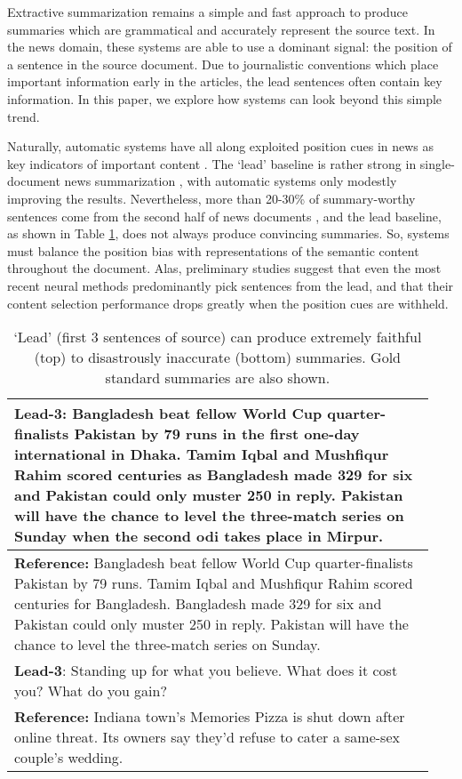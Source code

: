 Extractive summarization remains a simple 
and fast approach to produce summaries which 
are grammatical and accurately represent the source text.
In the news domain, these systems are able to 
use a dominant signal: the position of a sentence 
in the source document. 
Due to journalistic conventions which place important information
early in the articles, the lead sentences often contain key information. In this paper, we explore how systems can look beyond this simple trend. 

Naturally, automatic systems have 
all along exploited position cues in news 
as key indicators of important content \parencite{schiffman,hong2014improving,ext_bert}. 
The `lead' baseline is rather strong in single-document news summarization \parencite{brandow1995automatic,nenkova2005automatic}, 
with automatic systems only modestly improving the results. 
Nevertheless, more than 20-30\% of 
summary-worthy sentences come from the second half of news documents \parencite{data2_nallapati2016abstractive,kedzie2018content}, 
and the lead baseline, as shown in Table \ref{tab:lead_ex},
does not always produce convincing summaries.
So, systems must balance the position bias with representations of the semantic content 
throughout the document. Alas, preliminary studies
\parencite{kedzie2018content} suggest that even the most recent neural 
methods predominantly pick sentences from the lead, and 
that their content selection performance drops greatly
when the position cues are withheld.

\begin{table}[t]
    \centering
    \small
    \begin{tabular}{|p{0.94\linewidth}|}
        \hline
        \textbf{Lead-3:} Bangladesh beat fellow World Cup quarter-finalists Pakistan by 79 runs in the first one-day international in Dhaka. Tamim Iqbal and Mushfiqur Rahim scored centuries as Bangladesh made 329 for six and Pakistan could only muster 250 in reply. Pakistan will have the chance to level the three-match series on Sunday when the second odi takes place in Mirpur. \\ \hline
        \textbf{Reference:} Bangladesh beat fellow World Cup quarter-finalists Pakistan by 79 runs. Tamim Iqbal and Mushfiqur Rahim scored centuries for Bangladesh. Bangladesh made 329 for six and Pakistan could only muster 250 in reply. Pakistan will have the chance to level the three-match series on Sunday. \\ \hline \hline
        \textbf{Lead-3}: Standing up for what you believe. What does it cost you? What do you gain? \\ \hline
        \textbf{Reference:} Indiana town's Memories Pizza is shut down after online threat. Its owners say they'd refuse to cater a same-sex couple's wedding. \\
        \hline
    \end{tabular}
    \caption{`Lead' (first 3 sentences of source) can produce extremely faithful (top) to disastrously inaccurate (bottom) summaries. Gold standard summaries are also shown.}
    \label{tab:lead_ex}
\end{table}

